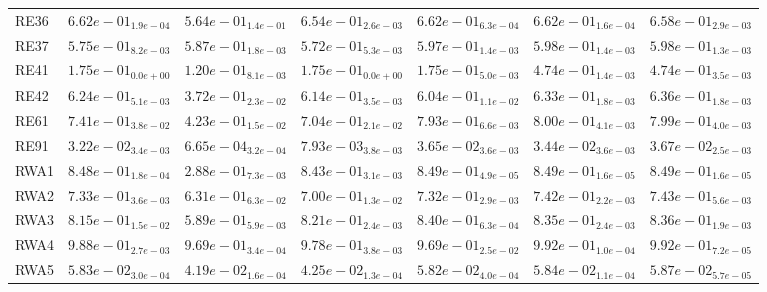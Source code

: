 \documentclass{article}
\begin{document}
\begin{table}
\begin{scriptsize}
\begin{tabular}{lllllll}
RE36 & \cellcolor{gray95}$  6.62e-01_{ 1.9e-04}$ & $  5.64e-01_{ 1.4e-01}$ & $  6.54e-01_{ 2.6e-03}$ & \cellcolor{gray25}$  6.62e-01_{ 6.3e-04}$ & $  6.62e-01_{ 1.6e-04}$ & $  6.58e-01_{ 2.9e-03}$ \\
RE37 & $  5.75e-01_{ 8.2e-03}$ & $  5.87e-01_{ 1.8e-03}$ & $  5.72e-01_{ 5.3e-03}$ & $  5.97e-01_{ 1.4e-03}$ & \cellcolor{gray95}$  5.98e-01_{ 1.4e-03}$ & \cellcolor{gray25}$  5.98e-01_{ 1.3e-03}$ \\
RE41 & $  1.75e-01_{ 0.0e+00}$ & $  1.20e-01_{ 8.1e-03}$ & $  1.75e-01_{ 0.0e+00}$ & $  1.75e-01_{ 5.0e-03}$ & \cellcolor{gray95}$  4.74e-01_{ 1.4e-03}$ & \cellcolor{gray25}$  4.74e-01_{ 3.5e-03}$ \\
RE42 & $  6.24e-01_{ 5.1e-03}$ & $  3.72e-01_{ 2.3e-02}$ & $  6.14e-01_{ 3.5e-03}$ & $  6.04e-01_{ 1.1e-02}$ & \cellcolor{gray25}$  6.33e-01_{ 1.8e-03}$ & \cellcolor{gray95}$  6.36e-01_{ 1.8e-03}$ \\
RE61 & $  7.41e-01_{ 3.8e-02}$ & $  4.23e-01_{ 1.5e-02}$ & $  7.04e-01_{ 2.1e-02}$ & $  7.93e-01_{ 6.6e-03}$ & \cellcolor{gray95}$  8.00e-01_{ 4.1e-03}$ & \cellcolor{gray25}$  7.99e-01_{ 4.0e-03}$ \\
RE91 & $  3.22e-02_{ 3.4e-03}$ & $  6.65e-04_{ 3.2e-04}$ & $  7.93e-03_{ 3.8e-03}$ & \cellcolor{gray25}$  3.65e-02_{ 3.6e-03}$ & $  3.44e-02_{ 3.6e-03}$ & \cellcolor{gray95}$  3.67e-02_{ 2.5e-03}$ \\
RWA1 & $  8.48e-01_{ 1.8e-04}$ & $  2.88e-01_{ 7.3e-03}$ & $  8.43e-01_{ 3.1e-03}$ & $  8.49e-01_{ 4.9e-05}$ & \cellcolor{gray25}$  8.49e-01_{ 1.6e-05}$ & \cellcolor{gray95}$  8.49e-01_{ 1.6e-05}$ \\
RWA2 & $  7.33e-01_{ 3.6e-03}$ & $  6.31e-01_{ 6.3e-02}$ & $  7.00e-01_{ 1.3e-02}$ & $  7.32e-01_{ 2.9e-03}$ & \cellcolor{gray25}$  7.42e-01_{ 2.2e-03}$ & \cellcolor{gray95}$  7.43e-01_{ 5.6e-03}$ \\
RWA3 & $  8.15e-01_{ 1.5e-02}$ & $  5.89e-01_{ 5.9e-03}$ & $  8.21e-01_{ 2.4e-03}$ & \cellcolor{gray95}$  8.40e-01_{ 6.3e-04}$ & $  8.35e-01_{ 2.4e-03}$ & \cellcolor{gray25}$  8.36e-01_{ 1.9e-03}$ \\
RWA4 & $  9.88e-01_{ 2.7e-03}$ & $  9.69e-01_{ 3.4e-04}$ & $  9.78e-01_{ 3.8e-03}$ & $  9.69e-01_{ 2.5e-02}$ & \cellcolor{gray25}$  9.92e-01_{ 1.0e-04}$ & \cellcolor{gray95}$  9.92e-01_{ 7.2e-05}$ \\
RWA5 & $  5.83e-02_{ 3.0e-04}$ & $  4.19e-02_{ 1.6e-04}$ & $  4.25e-02_{ 1.3e-04}$ & $  5.82e-02_{ 4.0e-04}$ & \cellcolor{gray25}$  5.84e-02_{ 1.1e-04}$ & \cellcolor{gray95}$  5.87e-02_{ 5.7e-05}$ \\

\end{tabular}
\end{scriptsize}
\end{table}
\end{document}
